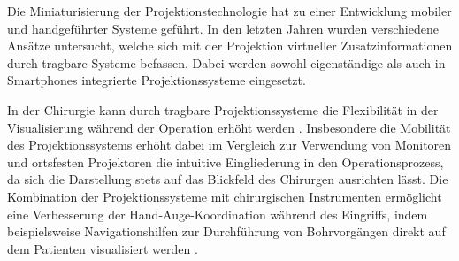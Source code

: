 

\prever{
}

\prever{
}

Die Miniaturisierung der Projektionstechnologie hat zu einer Entwicklung mobiler und handgeführter Systeme geführt. In den letzten Jahren wurden verschiedene Ansätze untersucht, welche sich mit der Projektion virtueller Zusatzinformationen durch tragbare Systeme befassen. Dabei werden sowohl eigenständige als auch in Smartphones integrierte Projektionssysteme eingesetzt.\\

\prever{
}

In der Chirurgie kann durch tragbare Projektionssysteme die Flexibilität in der Visualisierung während der Operation erhöht werden \cite{Kobler2010} \cite{Gavaghan2012}. Insbesondere die Mobilität des Projektionssystems erhöht dabei im Vergleich zur Verwendung von Monitoren und ortsfesten Projektoren die intuitive Eingliederung in den Operationsprozess, da sich die Darstellung stets auf das Blickfeld des Chirurgen ausrichten lässt. Die Kombination der Projektionssysteme mit chirurgischen Instrumenten ermöglicht eine Verbesserung der Hand-Auge-Koordination während des Eingriffs, indem beispielsweise Navigationshilfen zur Durchführung von Bohrvorgängen direkt auf dem Patienten visualisiert werden \cite{Kobler2012}.\\

